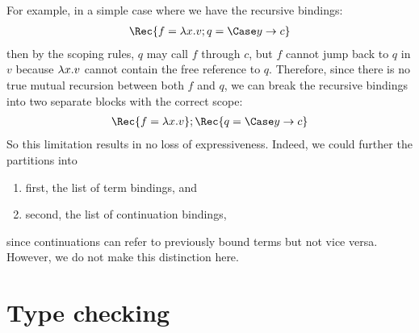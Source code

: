 \documentclass{article}
\begin{document}
For example, in a simple case where we have the recursive bindings:
\begin{gather*}
  \Rec \{ \bind{f}{\fn x v}; \bind{q}{\Case\alt{y}{c}} \}
\end{gather*}
then by the scoping rules, $q$ may call $f$ through $c$, but $f$
cannot jump back to $q$ in $v$ because $\lambda{x}. v$ cannot contain the
free reference to $q$.  Therefore, since there is no true mutual
recursion between both $f$ and $q$, we can break the recursive
bindings into two separate blocks with the correct scope:
\begin{gather*}
  \Rec \{ \bind{f}{\fn x v} \}; \Rec \{ \bind{q}{\Case\alt{y}{c}} \}
\end{gather*}
So this limitation results in no loss of expressiveness.  Indeed, we
could further the partitions into
\begin{enumerate}
\item first, the list of term bindings, and
\item second, the list of continuation bindings,
\end{enumerate}
since continuations can refer to previously bound terms but not vice
versa.  However, we do not make this distinction here.

\section{Type checking}
\label{sec:typing}
\end{document}

